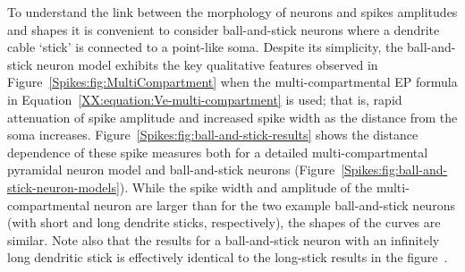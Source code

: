  
To understand the link between the morphology of neurons and spikes amplitudes and shapes
it is convenient to consider ball-and-stick neurons where a dendrite cable `stick' is connected to a point-like soma.
Despite its simplicity, the ball-and-stick neuron model exhibits the key qualitative features observed in
Figure~\ref{Spikes:fig:MultiCompartment} 
when the multi-compartmental EP formula in  Equation~\ref{XX:equation:Ve-multi-compartment}
is used; that is, rapid attenuation of spike amplitude 
and increased spike width as the distance from the soma increases.
Figure~\ref{Spikes:fig:ball-and-stick-results}
shows the distance dependence of these spike measures both for a detailed multi-compartmental pyramidal neuron model 
and ball-and-stick neurons (Figure~\ref{Spikes:fig:ball-and-stick-neuron-models}).
While the spike width and amplitude of the multi-compartmental neuron are larger than for
the two example ball-and-stick neurons (with short and long dendrite sticks, respectively), 
the shapes of the curves are similar. Note also that the results for a ball-and-stick neuron with an infinitely long dendritic stick is
effectively identical to the long-stick results in the figure~\citep{Pettersen2008}.


